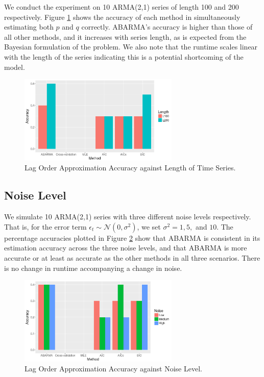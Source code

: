 We conduct the experiment on 10 ARMA(2,1) series of length 100 and 200 respectively. Figure \ref{length21} shows the accuracy of each method in simultaneously estimating both $p$ and $q$ correctly. ABARMA's accuracy is higher than those of all other methods, and it increases with series length, as is expected from the Bayesian formulation of the problem.  We also note that the runtime scales linear with the length of the series indicating this is a potential shortcoming of the model.

\begin{figure}
    \centering
    \includegraphics[width=3in]{length21.png}
    \caption{Lag Order Approximation Accuracy against Length of Time Series.}
    \label{length21}
\end{figure}


\subsection{Noise Level}

We simulate 10 ARMA(2,1) series with three different noise levels respectively. That is, for the error term $\epsilon_t \sim \mathcal{N}(0,\sigma^2)$, we set $\sigma^2 = 1,5,$ and $10$. The percentage accuracies plotted in Figure \ref{noise21} show that ABARMA is consistent in its estimation accuracy across the three noise levels, and that ABARMA is more accurate or at least as accurate as the other methods in all three scenarios.  There is no change in runtime accompanying a change in noise.

\begin{figure}
    \centering
    \includegraphics[width=3in]{noise21.png}
    \caption{Lag Order Approximation Accuracy against Noise Level.}
    \label{noise21}
\end{figure}

